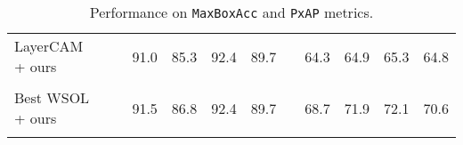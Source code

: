 \documentclass[twocolumn]{article}
\newcommand\maxboxacc{\texttt{MaxBoxAcc}\xspace}
\newcommand\pxap{\texttt{PxAP}\xspace}
\theoremstyle{definition}
\begin{document}
{\begin{table}[ht!]
{\begin{tabular}{lc*{3}{c}gc*{3}{c}g}
LayerCAM~\cite{zhou2016learning}    + ours   &  &         91.0 & 85.3 & 92.4 & 89.7 &  & 64.3 & 64.9 & 65.3 & 64.8 \\
 \\
Best WSOL + ours &  &                                      91.5 & 86.8 & 92.4 & 89.7 &  & 68.7 & 71.9 & 72.1 & 70.6 \\
\\
\end{tabular}
}
\caption{Performance on \maxboxacc and \pxap metrics.}
\label{tab:maxbox-pxap}
\vspace{-1em}
\end{table}
}
\end{document}
